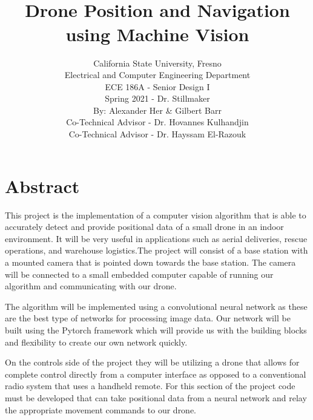 \documentclass[12pt,onecolumn]{IEEEtran}			%
\title{ \hfill  \vspace{2in} \\ Drone Position and Navigation using Machine Vision  \vspace{1in} }	%
\author{California State University, Fresno \\
Electrical and Computer Engineering Department \\
ECE 186A - Senior Design I \\ 					%
Spring 2021 - Dr. Stillmaker \\ 					%

\vspace{12pt} 								%
By: Alexander Her 
\&
Gilbert Barr \\
Co-Technical Advisor - Dr. Hovannes Kulhandjin \\
Co-Technical Advisor - Dr. Hayssam El-Razouk
\vspace{2in}								%


\vspace{4in}}								%
\begin{document}
\maketitle									%
\thispagestyle{empty}						%
\newpage

\newpage


 


\begin{versionhistory}
  
\end{versionhistory}


\newpage 
\tableofcontents %

\newpage
\listoffigures
\listoftables



 
 \newpage 
 \section*{Abstract}
 This project is the implementation of a computer vision algorithm that is able to accurately detect and provide positional data of a small drone in an indoor environment. It will be very useful in applications such as aerial deliveries, rescue operations, and warehouse logistics.The project will consist of a base station with a mounted camera that is pointed down towards the base station. The camera will be connected to a small embedded computer capable of running our algorithm and communicating with our drone. 
 
 The algorithm will be implemented using a convolutional neural network as these are the best type of networks for processing image data. Our network will be built using the Pytorch framework which will provide us with the building blocks and flexibility to create our own network quickly.
 
 On the controls side of the project they will be utilizing a drone that allows for complete control directly from a computer interface as opposed to a conventional radio system that uses a handheld remote. For this section of the project code must be developed that can take positional data from a neural network and relay the appropriate movement commands to our drone.
 
\end{document}

